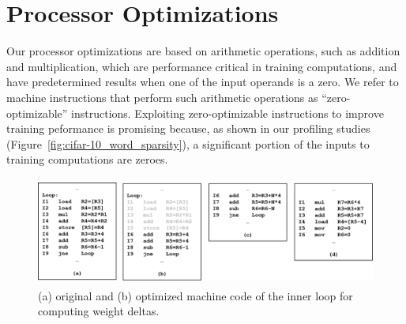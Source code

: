 \section{Processor Optimizations}
\label{sec:processor_opt}

Our processor optimizations are based on arithmetic operations, such as addition and multiplication, which are performance critical in training computations, and have predetermined results when one of the input operands is a zero. We refer to machine instructions that perform such arithmetic operations as ``zero-optimizable'' instructions. Exploiting zero-optimizable instructions to improve training peformance is promising because, as shown in our profiling studies (Figure~\ref{fig:cifar-10_word_sparsity}), a significant portion of the inputs to training computations are zeroes. 

\begin{figure}
\centering
\includegraphics[height=1.4in, width=1.9\columnwidth]{Figures/deltas_code_opt.png}
\caption{(a) original and (b) optimized machine code of the inner loop for computing weight deltas.}
\label{fig:deltas_code_opt}
\end{figure}



